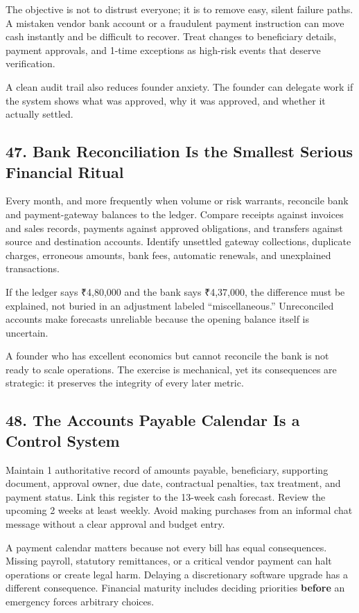 The objective is not to distrust everyone; it is to remove easy, silent failure paths. A mistaken vendor bank account or a fraudulent payment instruction can move cash instantly and be difficult to recover. Treat changes to beneficiary details, payment approvals, and 1-time exceptions as high-risk events that deserve verification.

A clean audit trail also reduces founder anxiety. The founder can delegate work if the system shows what was approved, why it was approved, and whether it actually settled.

\subsection*{47. Bank Reconciliation Is the Smallest Serious Financial Ritual}

Every month, and more frequently when volume or risk warrants, reconcile bank and payment-gateway balances to the ledger. Compare receipts against invoices and sales records, payments against approved obligations, and transfers against source and destination accounts. Identify unsettled gateway collections, duplicate charges, erroneous amounts, bank fees, automatic renewals, and unexplained transactions.

If the ledger says ₹4,80,000 and the bank says ₹4,37,000, the difference must be explained, not buried in an adjustment labeled ``miscellaneous.'' Unreconciled accounts make forecasts unreliable because the opening balance itself is uncertain.

A founder who has excellent economics but cannot reconcile the bank is not ready to scale operations. The exercise is mechanical, yet its consequences are strategic: it preserves the integrity of every later metric.

\subsection*{48. The Accounts Payable Calendar Is a Control System}

Maintain 1 authoritative record of amounts payable, beneficiary, supporting document, approval owner, due date, contractual penalties, tax treatment, and payment status. Link this register to the 13-week cash forecast. Review the upcoming 2 weeks at least weekly. Avoid making purchases from an informal chat message without a clear approval and budget entry.

A payment calendar matters because not every bill has equal consequences. Missing payroll, statutory remittances, or a critical vendor payment can halt operations or create legal harm. Delaying a discretionary software upgrade has a different consequence. Financial maturity includes deciding priorities \textbf{before} an emergency forces arbitrary choices.

